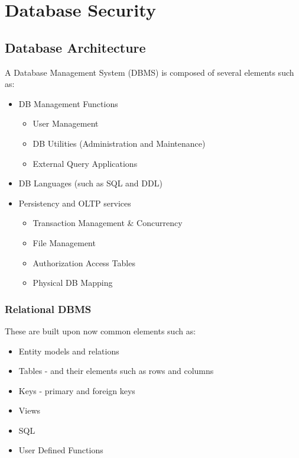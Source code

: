 \section{Database Security}

\subsection{Database Architecture}
A Database Management System (DBMS) is composed of several elements such as:
\begin{itemize}
    \item DB Management Functions
          \begin{itemize}
              \item User Management
              \item DB Utilities (Administration and Maintenance)
              \item External Query Applications
          \end{itemize}
    \item DB Languages (such as SQL and DDL)
    \item Persistency and OLTP services
          \begin{itemize}
              \item Transaction Management \& Concurrency
              \item File Management
              \item Authorization Access Tables
              \item Physical DB Mapping
          \end{itemize}
\end{itemize}

\subsubsection{Relational DBMS}
These are built upon now common elements such as:

\begin{itemize}
    \item Entity models and relations
    \item Tables - and their elements such as rows and columns
    \item Keys - primary and foreign keys
    \item Views
    \item SQL
    \item User Defined Functions
\end{itemize}


